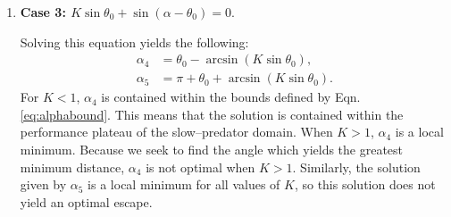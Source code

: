 \documentclass[12pt]{article}
\begin{document}
\begin{enumerate}

\item[]{\bf Case 3: $K\sin \theta_0 + \sin(\alpha -\theta_0) = 0.$}

Solving this equation yields the following:
%
\begin{align*}
\alpha_4 & = \theta_0 - \arcsin(K \sin \theta_0), \\
\alpha_5 & = \pi + \theta_0 + \arcsin(K \sin \theta_0).
\end{align*}
%
For $K<1$, $\alpha_4$ is contained within the bounds defined by Eqn. \ref{eq:alphabound}. This means that the solution is contained within the performance plateau of the slow--predator domain. 
When $K>1$, $\alpha_4$ is a local minimum. Because we seek to find the angle which yields the greatest minimum distance, $\alpha_4$ is not optimal when $K>1.$ 
Similarly, the solution given by $\alpha_5$ is a local minimum for all values of $K$, so this solution does not yield an optimal escape. 
\end{enumerate}
 
\end{document}
